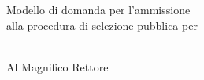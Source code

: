 \begin{minipage}{.5\textwidth}
 Modello di domanda per l'ammissione	\\[3pt]
 alla  procedura di selezione pubblica per\\[3pt]
 \titleTextField{}\\[3pt]
\end{minipage}

\begin{flushright}
\begin{minipage}{.45\textwidth}
 \flushright Al Magnifico Rettore
 \flushright \titleTextField{}
\end{minipage}
\end{flushright}
